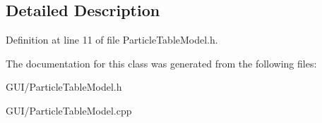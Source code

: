\subsection{Detailed Description}


Definition at line 11 of file Particle\+Table\+Model.\+h.



The documentation for this class was generated from the following files\+:\begin{DoxyCompactItemize}
\item 
G\+U\+I/Particle\+Table\+Model.\+h\item 
G\+U\+I/Particle\+Table\+Model.\+cpp\end{DoxyCompactItemize}
